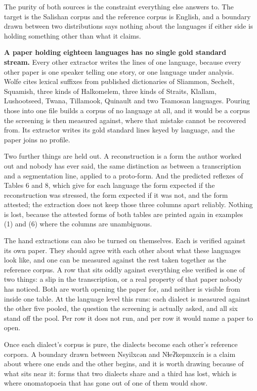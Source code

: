 The purity of both sources is the constraint everything else answers to. The target is the Salishan corpus and the reference corpus is English, and a boundary drawn between two distributions says nothing about the languages if either side is holding something other than what it claims.

\textbf{A paper holding eighteen languages has no single gold standard stream.} Every other extractor writes the lines of one language, because every other paper is one speaker telling one story, or one language under analysis. Wolfe cites lexical suffixes from published dictionaries of Sliammon, Sechelt, Squamish, three kinds of Halkomelem, three kinds of Straits, Klallam, Lushootseed, Twana, Tillamook, Quinault and two Tsamosan languages. Pouring those into one file builds a corpus of no language at all, and it would be a corpus the screening is then measured against, where that mistake cannot be recovered from. Its extractor writes its gold standard lines keyed by language, and the paper joins no profile.

Two further things are held out. A reconstruction is a form the author worked out and nobody has ever said, the same distinction as between a transcription and a segmentation line, applied to a proto-form. And the predicted reflexes of Tables 6 and 8, which give for each language the form expected if the reconstruction was stressed, the form expected if it was not, and the form attested; the extraction does not keep those three columns apart reliably. Nothing is lost, because the attested forms of both tables are printed again in examples (1) and (6) where the columns are unambiguous.

The hand extractions can also be turned on themselves. Each is verified against its own paper. They should agree with each other about what these languages look like, and one can be measured against the rest taken together as the reference corpus. A row that sits oddly against everything else verified is one of two things: a slip in the transcription, or a real property of that paper nobody has noticed. Both are worth opening the paper for, and neither is visible from inside one table. At the language level this runs: each dialect is measured against the other five pooled, the question the screening is actually asked, and all six stand off the pool. Per row it does not run, and per row it would name a paper to open.

Once each dialect's corpus is pure, the dialects become each other's reference corpora. A boundary drawn between Nsyilxcən and Nɬeʔkepmxcín is a claim about where one ends and the other begins, and it is worth drawing because of what sits near it: forms that two dialects share and a third has lost, which is where onomatopoeia that has gone out of one of them would show.

